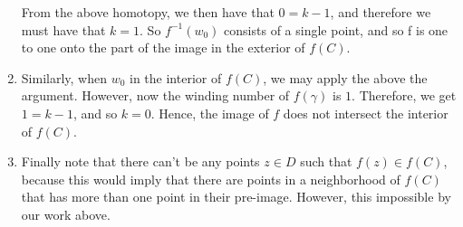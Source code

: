 \begin{enumerate}
From the above homotopy, we then have that \(0 = k - 1\), and therefore we must have that \(k = 1\). So 
\(f^{-1}(w_0)\) consists of a single point, and so f is one to one onto the part of the image in the exterior
of \(f(C)\).

\item Similarly, when \(w_0\) in the interior of \(f(C)\), we may apply the above the argument. However, now the
winding number of \(f(\gamma)\) is \(1\). Therefore, we get \(1 = k - 1\), and so \(k = 0\). Hence, the image of
\(f\) does not intersect the interior of \(f(C)\). 

\item Finally note that there can't be any points \(z \in D\) such that \(f(z) \in f(C)\), because this would
imply that there are points in a neighborhood of \(f(C)\) that has more than one point in their pre-image. However,
this impossible by our work above. 
\end{enumerate}
